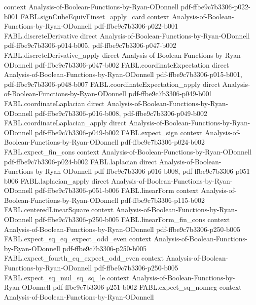 \begin{theorem}
  {context}
  {Analysis-of-Boolean-Functions-by-Ryan-ODonnell}
  {pdf-ffbe9c7b3306-p022-b001}
\proofstep
  {FABL.signCubeEquivFinset_apply_card}
  {context}
  {Analysis-of-Boolean-Functions-by-Ryan-ODonnell}
  {pdf-ffbe9c7b3306-p022-b001}
\proofstep
  {FABL.discreteDerivative}
  {direct}
  {Analysis-of-Boolean-Functions-by-Ryan-ODonnell}
  {pdf-ffbe9c7b3306-p014-b005,
    pdf-ffbe9c7b3306-p047-b002}
\proofstep
  {FABL.discreteDerivative_apply}
  {direct}
  {Analysis-of-Boolean-Functions-by-Ryan-ODonnell}
  {pdf-ffbe9c7b3306-p047-b002}
\proofstep
  {FABL.coordinateExpectation}
  {direct}
  {Analysis-of-Boolean-Functions-by-Ryan-ODonnell}
  {pdf-ffbe9c7b3306-p015-b001,
    pdf-ffbe9c7b3306-p048-b007}
\proofstep
  {FABL.coordinateExpectation_apply}
  {direct}
  {Analysis-of-Boolean-Functions-by-Ryan-ODonnell}
  {pdf-ffbe9c7b3306-p049-b001}
\proofstep
  {FABL.coordinateLaplacian}
  {direct}
  {Analysis-of-Boolean-Functions-by-Ryan-ODonnell}
  {pdf-ffbe9c7b3306-p016-b008,
    pdf-ffbe9c7b3306-p049-b002}
\proofstep
  {FABL.coordinateLaplacian_apply}
  {direct}
  {Analysis-of-Boolean-Functions-by-Ryan-ODonnell}
  {pdf-ffbe9c7b3306-p049-b002}
\proofstep
  {FABL.expect_sign}
  {context}
  {Analysis-of-Boolean-Functions-by-Ryan-ODonnell}
  {pdf-ffbe9c7b3306-p024-b002}
\proofstep
  {FABL.expect_fin_cons}
  {context}
  {Analysis-of-Boolean-Functions-by-Ryan-ODonnell}
  {pdf-ffbe9c7b3306-p024-b002}
\proofstep
  {FABL.laplacian}
  {direct}
  {Analysis-of-Boolean-Functions-by-Ryan-ODonnell}
  {pdf-ffbe9c7b3306-p016-b008,
    pdf-ffbe9c7b3306-p051-b006}
\proofstep
  {FABL.laplacian_apply}
  {direct}
  {Analysis-of-Boolean-Functions-by-Ryan-ODonnell}
  {pdf-ffbe9c7b3306-p051-b006}
\proofstep
  {FABL.linearForm}
  {context}
  {Analysis-of-Boolean-Functions-by-Ryan-ODonnell}
  {pdf-ffbe9c7b3306-p115-b002}
\proofstep
  {FABL.centeredLinearSquare}
  {context}
  {Analysis-of-Boolean-Functions-by-Ryan-ODonnell}
  {pdf-ffbe9c7b3306-p250-b005}
\proofstep
  {FABL.linearForm_fin_cons}
  {context}
  {Analysis-of-Boolean-Functions-by-Ryan-ODonnell}
  {pdf-ffbe9c7b3306-p250-b005}
\proofstep
  {FABL.expect_sq_eq_expect_odd_even}
  {context}
  {Analysis-of-Boolean-Functions-by-Ryan-ODonnell}
  {pdf-ffbe9c7b3306-p250-b005}
\proofstep
  {FABL.expect_fourth_eq_expect_odd_even}
  {context}
  {Analysis-of-Boolean-Functions-by-Ryan-ODonnell}
  {pdf-ffbe9c7b3306-p250-b005}
\proofstep
  {FABL.expect_sq_mul_sq_sq_le}
  {context}
  {Analysis-of-Boolean-Functions-by-Ryan-ODonnell}
  {pdf-ffbe9c7b3306-p251-b002}
\proofstep
  {FABL.expect_sq_nonneg}
  {context}
  {Analysis-of-Boolean-Functions-by-Ryan-ODonnell}

\end{theorem}
